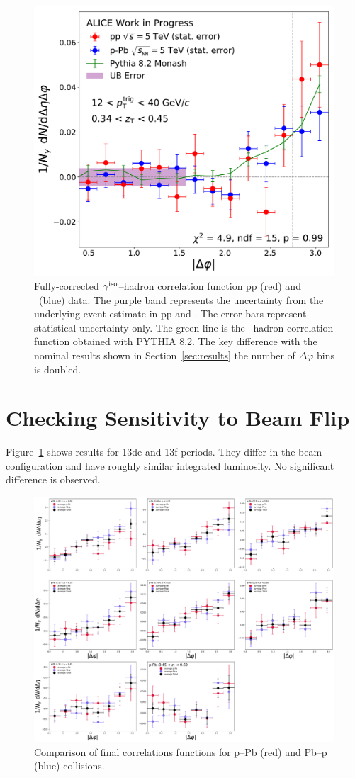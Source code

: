 \begin{figure}
\includegraphics[width = 0.24 \textwidth]{G-H_New/16_dPhi/Cs_Final_Indv_pT_0_zT_6.pdf}
\caption{Fully-corrected $\gamma^\mathrm{iso}$--hadron correlation function pp (red) and \pPb~(blue) data. The purple band represents the uncertainty from the underlying event estimate in pp and \pPb. The error bars represent statistical uncertainty only. The green line is the \gammaiso--hadron correlation function obtained with \textsc{PYTHIA 8.2}. The key difference with the nominal results shown in Section~\ref{sec:results} the number of $\Delta\varphi$ bins is doubled.}
\end{figure}


\section{Checking Sensitivity to Beam Flip}
Figure~\ref{fig:Cs_Beam_Flip} shows results for 13de and 13f periods. They differ in the beam configuration and have roughly similar integrated luminosity. No significant difference is observed. 

\begin{figure}
\centering
\includegraphics[width = 0.9 \textwidth]{G-H_New/Cs_Averages_p-Pb_Beam_Flip.pdf}
\caption{Comparison of final correlations functions for p--Pb (red) and Pb--p (blue) collisions.}
\label{fig:Cs_Beam_Flip}
\end{figure}



